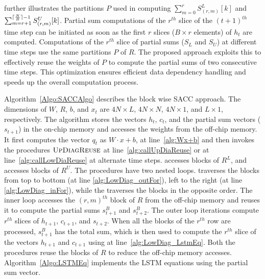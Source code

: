  further illustrates the partitions $P$ used in computing $\sum_{m{=}0}^{r}S_{(r,m)}^{L}[k]$ and $\sum_{m{=}r{+}1}^{\lceil\frac{N}{B}\rceil{-}1}S_{(r,m)}^{U}[k]$.
Partial sum computations of the $r^{th}$ slice of the $(t{+}1)^{th}$ time step can be initiated as soon as the first $r$ slices ($B{\times}r$ elements) of $h_t$ are computed. Computations of the $r^{th}$ slice of partial sums ($S_L$ and $S_U$) at different time steps use the same partitions $P$ of $R$. The proposed approach exploits this to effectively reuse the weights of $P$ to compute the partial sums of two consecutive time steps. This optimization ensures efficient data dependency handling and speeds up the overall computation process.

Algorithm~\ref{Algo:SACCAlgo} describes the block wise SACC approach. The dimensions of $W$, $R$, $b$, and $x_t$ are $4N{\times}L$, $4N{\times}N$, $4N{\times}1$, and $L{\times}1$, respectively. The algorithm stores the vectors $h_t$, $c_t$, and the partial sum vectors ($s_{t+1}$) in the on-chip memory and accesses the weights from the off-chip memory. It first computes the vector $q_t$ as $W{\cdot}x{+}b$, at line~\ref{alg:Wx+b} and then invokes the procedures $\textproc{UpDiagReuse}$ at line~\ref{alg:callUpDiaReuse} or   at line~\ref{alg:callLowDiaReuse} at alternate time steps.  accesses blocks of $R^L$, and  accesses blocks of $R^U$. The procedures have two nested loops.  traverses the blocks from top to bottom (at line \ref{alg:LowDiag_outFor}), left to the right (at line \ref{alg:LowDiag_inFor}), while the  traverses the blocks in the opposite order. The inner loop accesses the $(r,m)^{th}$ block of $R$ from the off-chip memory and reuses it to compute the partial sums $s^B_{t+1}$ and $s^B_{t+2}$. The outer loop iterations compute $r^{th}$ slices of $h_{t+1}$, $c_{t+1}$, and $s_{t+2}$.
When all the blocks of the $r^{th}$ row are processed, $s^B_{t+1}$ has the total sum, which is then used to compute the $r^{th}$ slice of the vectors $h_{t+1}$ and $c_{t+1}$ using  at line~\ref{alg:LowDiag_LstmEq}. 
Both the procedures reuse the blocks of $R$ to reduce the off-chip memory accesses. Algorithm~\ref{Algo:LSTMEq} implements the LSTM equations using the partial sum vector.


